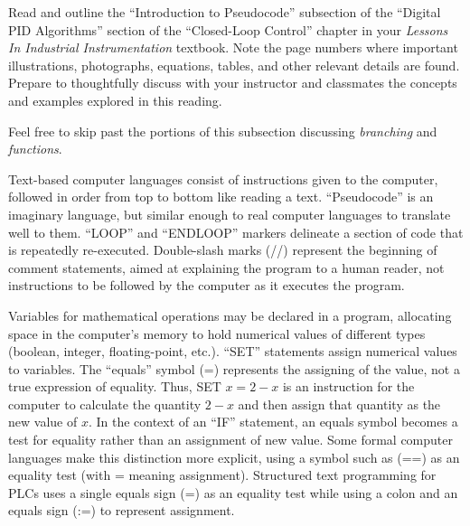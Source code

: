 

Read and outline the ``Introduction to Pseudocode'' subsection of the ``Digital PID Algorithms'' section of the ``Closed-Loop Control'' chapter in your {\it Lessons In Industrial Instrumentation} textbook.  Note the page numbers where important illustrations, photographs, equations, tables, and other relevant details are found.  Prepare to thoughtfully discuss with your instructor and classmates the concepts and examples explored in this reading.

\vskip 10pt

Feel free to skip past the portions of this subsection discussing {\it branching} and {\it functions}.







 






Text-based computer languages consist of instructions given to the computer, followed in order from top to bottom like reading a text.  ``Pseudocode'' is an imaginary language, but similar enough to real computer languages to translate well to them.  ``LOOP'' and ``ENDLOOP'' markers delineate a section of code that is repeatedly re-executed.  Double-slash marks (//) represent the beginning of comment statements, aimed at explaining the program to a human reader, not instructions to be followed by the computer as it executes the program.

\vskip 10pt

Variables for mathematical operations may be declared in a program, allocating space in the computer's memory to hold numerical values of different types (boolean, integer, floating-point, etc.).  ``SET'' statements assign numerical values to variables.  The ``equals'' symbol (=) represents the assigning of the value, not a true expression of equality.  Thus, SET $x = 2-x$ is an instruction for the computer to calculate the quantity $2-x$ and then assign that quantity as the new value of $x$.  In the context of an ``IF'' statement, an equals symbol becomes a test for equality rather than an assignment of new value.  Some formal computer languages make this distinction more explicit, using a symbol such as (==) as an equality test (with = meaning assignment).  Structured text programming for PLCs uses a single equals sign (=) as an equality test while using a colon and an equals sign (:=) to represent assignment.

